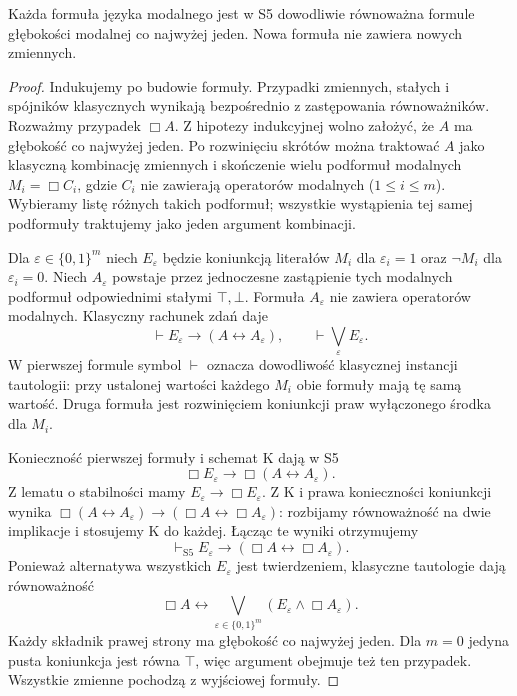 \begin{twierdzenie}
\label{thm:ncl-modal-S5-depth-one}
Każda formuła języka modalnego jest w S5
dowodliwie równoważna formule głębokości
modalnej co najwyżej jeden.
Nowa formuła nie zawiera nowych zmiennych.
\end{twierdzenie}
\begin{proof}
Indukujemy po budowie formuły.
Przypadki zmiennych, stałych i spójników
klasycznych wynikają bezpośrednio
z zastępowania równoważników.
Rozważmy przypadek $\Box A$.
Z hipotezy indukcyjnej wolno założyć,
że $A$ ma głębokość co najwyżej jeden.
Po rozwinięciu skrótów można traktować $A$
jako klasyczną kombinację zmiennych i
skończenie wielu podformuł modalnych
$M_i=\Box C_i$, gdzie $C_i$ nie zawierają
operatorów modalnych ($1\leq i\leq m$).
Wybieramy listę różnych takich podformuł;
wszystkie wystąpienia tej samej podformuły
traktujemy jako jeden argument kombinacji.

Dla $\varepsilon\in\{0,1\}^m$ niech $E_\varepsilon$
będzie koniunkcją literałów $M_i$ dla
$\varepsilon_i=1$ oraz $\neg M_i$ dla
$\varepsilon_i=0$. Niech $A_\varepsilon$ powstaje
przez jednoczesne zastąpienie tych modalnych
podformuł odpowiednimi stałymi $\top,\bot$.
Formuła $A_\varepsilon$ nie zawiera operatorów
modalnych. Klasyczny rachunek zdań daje
\[
 \vdash E_\varepsilon\to(A\leftrightarrow A_\varepsilon),
 \qquad \vdash\bigvee_\varepsilon E_\varepsilon.
\]
W pierwszej formule symbol $\vdash$ oznacza
dowodliwość klasycznej instancji tautologii:
przy ustalonej wartości każdego $M_i$
obie formuły mają tę samą wartość.
Druga formuła jest rozwinięciem koniunkcji
praw wyłączonego środka dla $M_i$.

Konieczność pierwszej formuły i schemat K
dają w S5
\[
 \Box E_\varepsilon\to
                  \Box(A\leftrightarrow A_\varepsilon).
\]
Z lematu o stabilności mamy
$E_\varepsilon\to\Box E_\varepsilon$.
Z K i prawa konieczności koniunkcji wynika
$\Box(A\leftrightarrow A_\varepsilon)\to
(\Box A\leftrightarrow\Box A_\varepsilon)$:
rozbijamy równoważność na dwie implikacje
i stosujemy K do każdej.
Łącząc te wyniki otrzymujemy
\[
 \vdash_{\mathrm{S5}} E_\varepsilon\to
              (\Box A\leftrightarrow\Box A_\varepsilon).
\]
Ponieważ alternatywa wszystkich $E_\varepsilon$
jest twierdzeniem, klasyczne tautologie
dają równoważność
\[
 \Box A\leftrightarrow
 \bigvee_{\varepsilon\in\{0,1\}^m}
      (E_\varepsilon\wedge\Box A_\varepsilon).
\]
Każdy składnik prawej strony ma głębokość
co najwyżej jeden. Dla $m=0$ jedyna pusta
koniunkcja jest równa $\top$, więc argument
obejmuje też ten przypadek.
Wszystkie zmienne pochodzą z wyjściowej formuły.
\end{proof}

